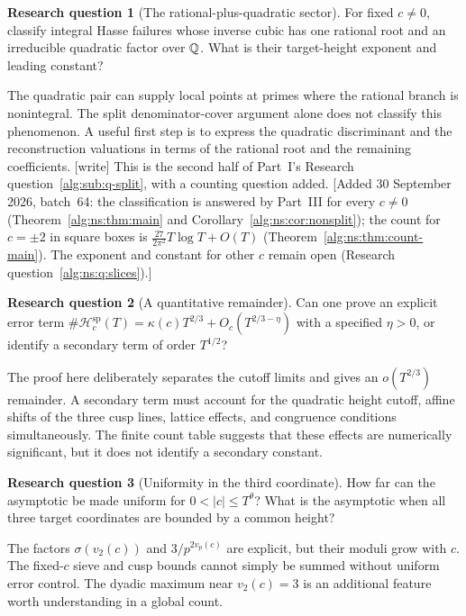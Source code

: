 \documentclass[11pt]{article}
\numberwithin{equation}{section}
\theoremstyle{plain}
\theoremstyle{plain}
\theoremstyle{plain}
\theoremstyle{definition}
\theoremstyle{definition}
\newtheorem{question}[question]{Research question}
\theoremstyle{definition}
\theoremstyle{remark}
\newcommand{\wtag}{\textup{[write]}}%
\newcommand{\Hsplit}{\mathcal H^{\mathrm{sp}}}
\begin{document}
\begin{question}[The rational-plus-quadratic sector]\label{alg:dh:q:quadratic}
For fixed $c\ne0$, classify integral Hasse failures whose inverse cubic
has one rational root and an irreducible quadratic factor over $\mathbb Q$.
What is their target-height exponent and leading constant?
\end{question}
The quadratic pair can supply local points at primes where the rational
branch is nonintegral. The split denominator-cover argument alone does
not classify this phenomenon. A useful first step is to express the
quadratic discriminant and the reconstruction valuations in terms of
the rational root and the remaining coefficients.
\wtag{} This is the second half of Part~I's Research
question~\ref{alg:sub:q-split}, with a counting question added.
[Added 30 September 2026, batch~64: the classification is answered by
Part~III for every $c\ne0$ (Theorem~\ref{alg:ns:thm:main} and
Corollary~\ref{alg:ns:cor:nonsplit}); the count for $c=\pm2$ in square
boxes is $\frac{27}{2\pi^2}T\log T+O(T)$
(Theorem~\ref{alg:ns:thm:count-main}). The exponent and constant for
other $c$ remain open (Research question~\ref{alg:ns:q:slices}).]

\begin{question}[A quantitative remainder]\label{alg:dh:q:remainder}
Can one prove an explicit error term
$\#\Hsplit_c(T)=\kappa(c)T^{2/3}+O_c(T^{2/3-\eta})$ with a specified
$\eta>0$, or identify a secondary term of order $T^{1/2}$?
\end{question}
The proof here deliberately separates the cutoff limits and gives an
$o(T^{2/3})$ remainder. A secondary term must account for the quadratic
height cutoff, affine shifts of the three cusp lines, lattice effects,
and congruence conditions simultaneously. The finite count table suggests
that these effects are numerically significant, but it does not identify
a secondary constant.

\begin{question}[Uniformity in the third coordinate]\label{alg:dh:q:uniform}
How far can the asymptotic be made uniform for $0<|c|\le T^\theta$?
What is the asymptotic when all three target coordinates are bounded
by a common height?
\end{question}
The factors $\sigma(v_2(c))$ and $3/p^{2v_p(c)}$ are explicit, but their
moduli grow with $c$. The fixed-$c$ sieve and cusp bounds cannot simply
be summed without uniform error control. The dyadic maximum near
$v_2(c)=3$ is an additional feature worth understanding in a global count.
\end{document}
